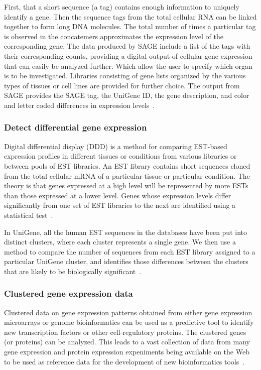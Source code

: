 \documentclass{report}
\begin{document}
First, that a short sequence (a tag) contains enough information to uniquely identify a gene. Then the sequence tags from the total cellular RNA can be linked together to form long DNA molecules. The total number of times a particular tag is observed in the concatemers approximates the expression level of the corresponding gene. The data produced by SAGE include a list of the tags with their corresponding counts, providing a digital output of cellular gene expression that can easily be analyzed further. Which allow the user to specify which organ is to be investigated. Libraries consisting of gene lists organized by the various types of tissues or cell lines are provided for further choice. The output from SAGE provides the SAGE tag, the UniGene ID, the gene description, and color and letter coded differences in expression levels~\cite{zvelebil_understanding_2008}.

\subsubsection{Detect differential gene expression}

Digital differential display (DDD) is a method for comparing EST-based expression profiles in different tissues or conditions from various libraries or between pools of EST libraries. An EST library contains short sequences cloned from the total cellular mRNA of a particular tissue or particular condition. The theory is that genes expressed at a high level will be represented by more ESTs than those expressed at a lower level. Genes whose expression levels differ significantly from one set of EST libraries to the next are identified using a statistical test~\cite{zvelebil_understanding_2008}.

In UniGene, all the human EST sequences in the databases have been put into distinct clusters, where each cluster represents a single gene. We then use a method to compare the number of sequences from each EST library assigned to a particular UniGene cluster, and identifies those differences between the clusters that are likely to be biologically significant~\cite{zvelebil_understanding_2008}.

\subsubsection{Clustered gene expression data}

Clustered data on gene expression patterns obtained from either gene expression microarrays or genome bioinformatics can be used as a predictive tool to identify new transcription factors or other cell-regulatory proteins. The clustered genes (or proteins) can be analyzed. This leads to a vast collection of data from many gene expression and protein expression expeniments being available on the Web to be used as reference data for the development of new bioinformatics tools~\cite{zvelebil_understanding_2008}.
\end{document}
